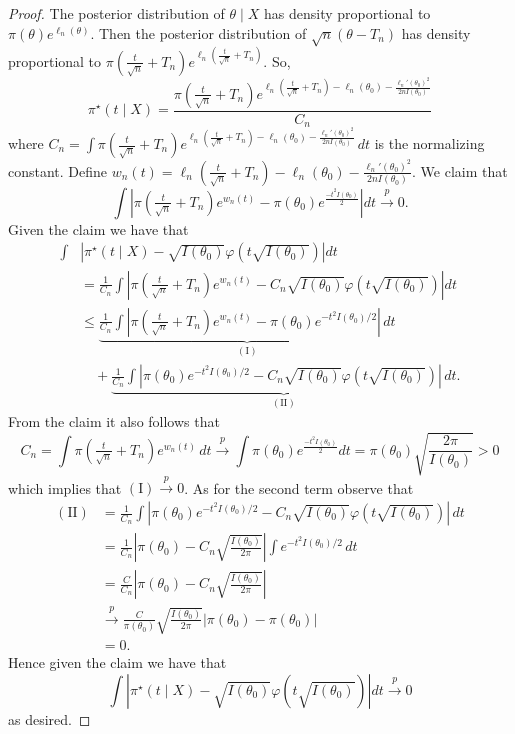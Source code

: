 \begin{proof}
	The posterior distribution of $\theta \mid X$ has density proportional to $\pi(\theta) e^{\ell_n(\theta)}$. Then the posterior distribution of $\sqrt{n} (\theta - T_n)$ has density proportional to $\pi\left(\frac{t}{\sqrt{n}} + T_n \right) e^{\ell_n\left(\frac{t}{\sqrt{n}} + T_n \right)}$. So, \[
		\pi^\star(t \mid X) = \frac{\pi\left(\frac{t}{\sqrt{n}} + T_n \right) e^{\ell_n\left(\frac{t}{\sqrt{n}} + T_n \right) - \ell_n(\theta_0) - \frac{\ell_n'(\theta_0)^2}{2nI(\theta_0)}}
		}{C_n}
	\] where \(
		C_n = \int \pi\left(\frac{t}{\sqrt{n}} + T_n \right) e^{\ell_n\left(\frac{t}{\sqrt{n}} + T_n \right) - \ell_n(\theta_0) - \frac{\ell_n'(\theta_0)^2}{2nI(\theta_0)}} \, dt
	\) is the normalizing constant. Define $w_n(t) = \ell_n\left(\frac{t}{\sqrt{n}} + T_n \right) - \ell_n(\theta_0) - \frac{\ell_n'(\theta_0)^2}{2n I(\theta_0)}$. We claim that \[
		\int \left| \pi\left(\tfrac{t}{\sqrt{n}} + T_n \right) e^{w_n(t)} - \pi(\theta_0) e^{\frac{-t^2 I(\theta_0)}{2}} \right| dt \overset{p}{\to} 0.
	\] Given the claim we have that \begin{align*}
		\int &\left|\pi^\star(t \mid X) - \sqrt{I(\theta_0)} \varphi(t\sqrt{I(\theta_0)}) \right| dt\\ 
		&=  \frac{1}{C_n}\int \left|\pi\left(\tfrac{t}{\sqrt{n}} + T_n \right) e^{w_n(t)}-C_n \sqrt{I(\theta_0)} \varphi(t\sqrt{I(\theta_0)})  \right| dt \\
		&\leq
		\underbrace{
		\frac{1}{C_n}\int
		\left|
		\pi\!\left(\tfrac{t}{\sqrt n}+T_n\right)e^{w_n(t)}
		-\pi(\theta_0)e^{-t^2I(\theta_0)/2}
		\right|\,dt
		}_{(\mathrm I)} \\
		&\quad+
		\underbrace{
		\frac{1}{C_n}\int
		\left|
		\pi(\theta_0)e^{-t^2I(\theta_0)/2}
		-C_n\sqrt{I(\theta_0)}
		 \varphi(t\sqrt{I(\theta_0)})
		\right|\,dt
		}_{(\mathrm{II})}.
	\end{align*}
	From the claim it also follows that \[
		C_n = \int \pi\left(\tfrac{t}{\sqrt{n}} + T_n \right) e^{w_n(t)}\,dt \overset{p}{\to} \int \pi(\theta_0) e^{\frac{-t^2 I(\theta_0)}{2}} dt = \pi(\theta_0) \sqrt{\frac{2\pi}{I(\theta_0)}} > 0
	\] which implies that $(\text{I}) \overset{p}{\to} 0$. As for the second term observe that \begin{align*}
		(\mathrm{II})
		&=\frac{1}{C_n}\int
		\left|
		\pi(\theta_0)e^{-t^2I(\theta_0)/2}
		-C_n\sqrt{I(\theta_0)}
		 \varphi(t\sqrt{I(\theta_0)})
		\right|\,dt \\
		&=\frac{1}{C_n}
		\left|
		\pi(\theta_0)-C_n\sqrt{\frac{I(\theta_0)}{2\pi}}
		\right|
		\int e^{-t^2I(\theta_0)/2}\,dt \\
		&=\frac{C}{C_n}
		\left|
		\pi(\theta_0)-C_n\sqrt{\frac{I(\theta_0)}{2\pi}}
		\right| \\
		&\overset{p}{\longrightarrow}
		\frac{C}{\pi(\theta_0)}
		\sqrt{\frac{I(\theta_0)}{2\pi}}
		|\pi(\theta_0)-\pi(\theta_0)| \\
		&=0.
	\end{align*}
	Hence given the claim we have that \[
	\int \left|\pi^\star(t \mid X) - \sqrt{I(\theta_0)} \varphi(t\sqrt{I(\theta_0)}) \right| dt \overset{p}{\to} 0
	\] as desired.  
	

\end{proof}
